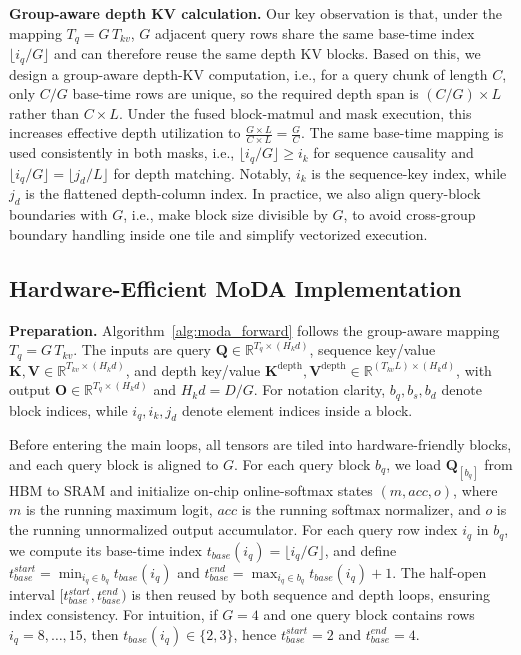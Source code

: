 \documentclass[]{bytedance_seed}
\newcommand{\myPara}[1]{\vspace{.05in}\noindent\textbf{#1.}}
\newcommand{\name}{MoDA}
\begin{document}
\myPara{Group-aware depth KV calculation}
Our key observation is that, under the mapping $T_q = G\,T_{kv}$, 
$G$ adjacent query rows share the same base-time index $\lfloor i_q/G\rfloor$ and can therefore reuse the same depth KV blocks.
Based on this, we design a group-aware depth-KV computation, i.e., for a query chunk of length $C$, only $C/G$ base-time rows are unique, so the required depth span is $(C/G)\times L$ rather than $C\times L$.
Under the fused block-matmul and mask execution, this increases effective depth utilization to $\frac{G\times L}{C\times L}=\frac{G}{C}$.
The same base-time mapping is used consistently in both masks, i.e., $\lfloor i_q/G\rfloor \ge i_k$ for sequence causality and $\lfloor i_q/G\rfloor = \lfloor j_d/L\rfloor$ for depth matching. %
Notably, $i_k$ is the sequence-key index, while $j_d$ is the flattened depth-column index.
In practice, we also align query-block boundaries with $G$, i.e., make block size divisible by $G$, 
to avoid cross-group boundary handling inside one tile and simplify vectorized execution.

\subsection{Hardware-Efficient \name{} Implementation}

\myPara{Preparation}
Algorithm~\ref{alg:moda_forward} follows the group-aware mapping $T_q=G\,T_{kv}$.
The inputs are query $\mathbf{Q}\in\mathbb{R}^{T_q\times (H_kd)}$, sequence key/value
$\mathbf{K},\mathbf{V}\in\mathbb{R}^{T_{kv}\times (H_kd)}$, and depth key/value
$\mathbf{K}^{\text{depth}},\mathbf{V}^{\text{depth}}\in\mathbb{R}^{(T_{kv}L)\times (H_kd)}$,
with output $\mathbf{O}\in\mathbb{R}^{T_q\times (H_kd)}$ and $H_kd=D/G$.
For notation clarity, $b_q,b_s,b_d$ denote block indices, while $i_q,i_k,j_d$ denote element indices inside a block.

Before entering the main loops, all tensors are tiled into hardware-friendly blocks, and each query block is aligned to $G$.
For each query block $b_q$, we load $\mathbf{Q}_{[b_q]}$ from HBM to SRAM and initialize on-chip online-softmax states $(m,acc,o)$,
where $m$ is the running maximum logit, $acc$ is the running softmax normalizer, and $o$ is the running unnormalized output accumulator.
For each query row index $i_q$ in $b_q$, we compute its base-time index
$t_{base}(i_q)=\lfloor i_q/G\rfloor$, and define
$t_{base}^{start}=\min_{i_q\in b_q}t_{base}(i_q)$ and
$t_{base}^{end}=\max_{i_q\in b_q}t_{base}(i_q)+1$.
The half-open interval $[t_{base}^{start},t_{base}^{end})$ is then reused by both sequence and depth loops, ensuring index consistency.
For intuition, if $G=4$ and one query block contains rows $i_q=8,\ldots,15$, then
$t_{base}(i_q)\in\{2,3\}$, hence $t_{base}^{start}=2$ and $t_{base}^{end}=4$.
\end{document}
